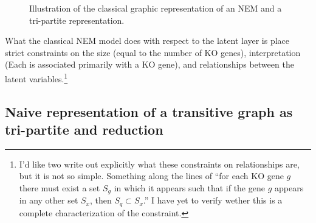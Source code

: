 \documentclass{article}
\begin{document}
\begin{figure}
%

\caption{Illustration of the classical graphic representation of an NEM and a tri-partite representation.}
\label{fig:nem-tri}
\end{figure}

What the classical NEM model does with respect to the latent layer is place strict constraints on the size (equal to the number of KO genes), interpretation (Each is associated primarily with a KO gene), and relationships between the latent variables.\footnote{I'd like two write out explicitly what these constraints on relationships are, but it is not so simple. Something along the lines of ``for each KO gene $g$ there must exist a set $S_g$ in which it appears such that if the gene $g$ appears in any other set $S_x$, then $S_q \subset S_x$.'' I have yet to verify wether this is a complete characterization of the constraint.}

\subsection{Naive representation of a transitive graph as tri-partite and reduction}
\end{document}
